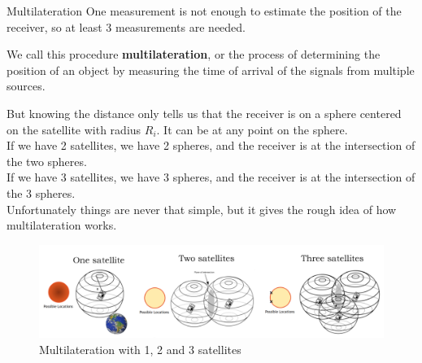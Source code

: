 \begin{section}{Multilateration}
    One measurement is not enough to estimate the position of the receiver, so at least 3 measurements
    are needed.\\
    \begin{boxH}
      We call this procedure \textbf{multilateration}, or the process of determining the position of an object
      by measuring the time of arrival of the signals from multiple sources.
    \end{boxH}

    But knowing the distance only tells us that the receiver is on a sphere centered on the satellite
    with radius $R_i$. It can be at any point on the sphere.\\
    If we have 2 satellites, we have 2 spheres, and the receiver is at the intersection of the two
    spheres.\\
    If we have 3 satellites, we have 3 spheres, and the receiver is at the intersection of the 3
    spheres.\\
    Unfortunately things are never that simple, but it gives the rough idea of how multilateration
    works.\\

    \begin{figure}[h]
      \centering
      \includegraphics[width=\textwidth]{img/wireless/multilateration comparison.png}
      \caption{Multilateration with 1, 2 and 3 satellites}
      \label{fig:Multilateration comparison}
    \end{figure}
  \end{section}
